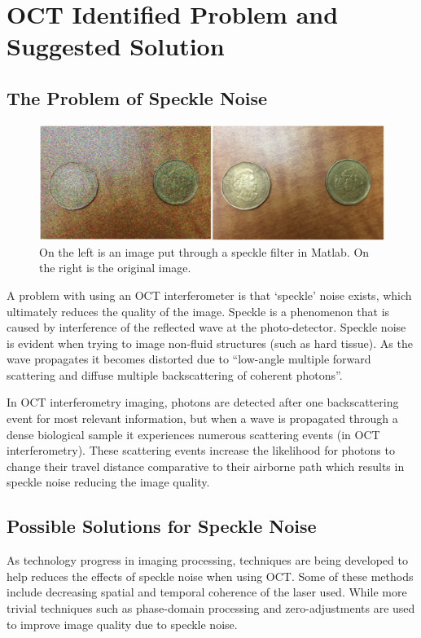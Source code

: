 \documentclass[%
reprint,
showpacs,preprintnumbers,
bibnotes,
amsmath,amssymb,
aps,
pra,
]{revtex4-1}
\begin{document}
	\section{\label{sec:level1}OCT Identified Problem and Suggested Solution}
	\subsection{\label{sec:level2} The Problem of Speckle Noise}
	\begin{figure}
		\centering
		\includegraphics[width=0.7\linewidth]{Figures/specklefilter2}
		\caption{On the left is an image put through a speckle filter in Matlab. On the right is the original image.}
		\label{fig:specklefilter2}
	\end{figure}
	A problem with using an OCT interferometer is that ‘speckle’ noise exists, which ultimately reduces the quality of the image. Speckle is a phenomenon that is caused by interference of the reflected wave at the photo-detector. Speckle noise is evident when trying to image non-fluid structures (such as hard tissue). As the wave propagates it becomes distorted due to “low-angle multiple forward scattering and diffuse multiple backscattering of coherent photons”. \cite{Popescu2007}

	In OCT interferometry imaging, photons are detected after one backscattering event for most relevant information, but when a wave is propagated through a dense biological sample it experiences numerous scattering events (in OCT interferometry). These scattering events increase the likelihood for photons to change their travel distance comparative to their airborne path which results in speckle noise reducing the image quality. \cite{Popescu2007}
	\subsection{\label{sec:level2} Possible Solutions for Speckle Noise}
	As technology progress in imaging processing, techniques are being developed to help reduces the effects of speckle noise when using OCT. Some of these methods include decreasing spatial and temporal coherence of the laser used. While more trivial techniques such as phase-domain processing and zero-adjustments are used to improve image quality due to speckle noise. \cite{Popescu2007}
\end{document}
